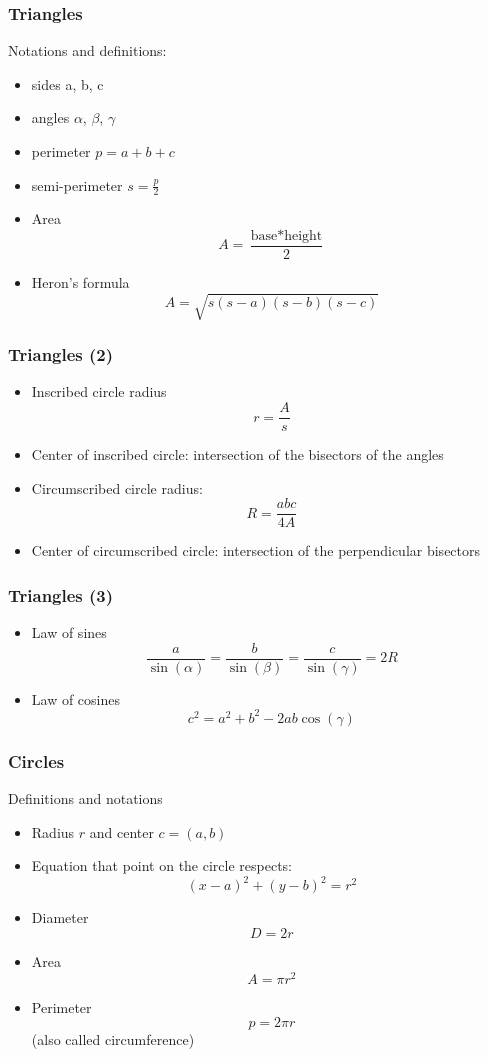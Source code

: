 \documentclass[pdf]{beamer}
\begin{document}
\begin{frame}
	\frametitle{Triangles}
	Notations and definitions:
	\begin{itemize}
		\item sides a, b, c
		\item angles $\alpha$, $\beta$, $\gamma$
		\item perimeter $p = a+b+c$
		\item semi-perimeter $s=\frac{p}{2}$
		\item Area $$A=\frac{\text{base}*\text{height}}{2}$$
		\item Heron's formula
		$$A=\sqrt{s(s-a)(s-b)(s-c)}$$
	\end{itemize}
\end{frame}

\begin{frame}
	\frametitle{Triangles (2)}
	\begin{itemize}
		\item Inscribed circle radius
			$$r=\frac{A}{s}$$
		\item Center of inscribed circle: intersection of the bisectors of the angles
		\item Circumscribed circle radius:
			$$R=\frac{abc}{4A}$$
		\item Center of circumscribed circle:
			intersection of the perpendicular bisectors
	\end{itemize}
\end{frame}

\begin{frame}
	\frametitle{Triangles (3)}
	\begin{itemize}
		\item Law of sines
			$$\frac{a}{\sin(\alpha)} = \frac{b}{\sin(\beta)} = \frac{c}{\sin(\gamma)}=2R$$
		\item Law of cosines
			$$c^2=a^2+b^2-2ab\cos(\gamma)$$
	\end{itemize}
\end{frame}

\begin{frame}
	\frametitle{Circles}
	Definitions and notations
	\begin{itemize}
		\item Radius $r$ and center $c = (a,b)$
		\item Equation that point on the circle respects: 
		$$(x-a)^2+(y-b)^2=r^2$$
		\item Diameter $$D=2r$$
		\item Area $$A= \pi r^2$$
		\item Perimeter $$p = 2\pi r$$ (also called circumference)
		
	\end{itemize}
\end{frame}
\end{document}
